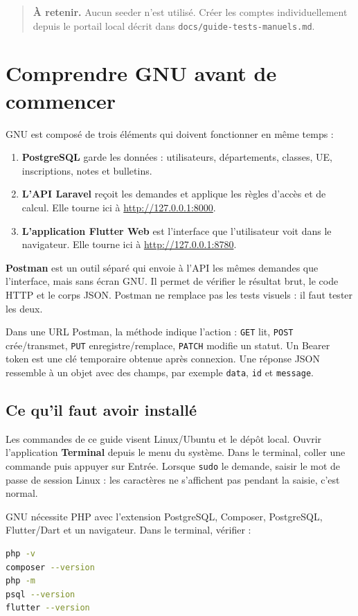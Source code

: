 \documentclass[10pt,a4paper]{article}
\newcommand{\note}[1]{\begin{quote}\colorbox{gnuPale}{\parbox{0.94\linewidth}{\textbf{À retenir. }#1}}\end{quote}}
\begin{document}
\note{Aucun seeder n’est utilisé. Créer les comptes individuellement depuis le portail local décrit dans \texttt{docs/guide-tests-manuels.md}.}

\section{Comprendre GNU avant de commencer}

GNU est composé de trois éléments qui doivent fonctionner en même temps :
\begin{enumerate}
\item \textbf{PostgreSQL} garde les données : utilisateurs, départements, classes, UE, inscriptions, notes et bulletins.
\item \textbf{L’API Laravel} reçoit les demandes et applique les règles d’accès et de calcul. Elle tourne ici à \url{http://127.0.0.1:8000}.
\item \textbf{L’application Flutter Web} est l’interface que l’utilisateur voit dans le navigateur. Elle tourne ici à \url{http://127.0.0.1:8780}.
\end{enumerate}

\textbf{Postman} est un outil séparé qui envoie à l’API les mêmes demandes que l’interface, mais sans écran GNU. Il permet de vérifier le résultat brut, le code HTTP et le corps JSON. Postman ne remplace pas les tests visuels : il faut tester les deux.

Dans une URL Postman, la méthode indique l’action : \texttt{GET} lit, \texttt{POST} crée/transmet, \texttt{PUT} enregistre/remplace, \texttt{PATCH} modifie un statut. Un Bearer token est une clé temporaire obtenue après connexion. Une réponse JSON ressemble à un objet avec des champs, par exemple \texttt{data}, \texttt{id} et \texttt{message}.

\subsection{Ce qu’il faut avoir installé}

Les commandes de ce guide visent Linux/Ubuntu et le dépôt local. Ouvrir l’application \textbf{Terminal} depuis le menu du système. Dans le terminal, coller une commande puis appuyer sur Entrée. Lorsque \texttt{sudo} le demande, saisir le mot de passe de session Linux : les caractères ne s’affichent pas pendant la saisie, c’est normal.

GNU nécessite PHP avec l’extension PostgreSQL, Composer, PostgreSQL, Flutter/Dart et un navigateur. Dans le terminal, vérifier :
\begin{lstlisting}[language=bash]
php -v
composer --version
php -m
psql --version
flutter --version
\end{lstlisting}
\end{document}
